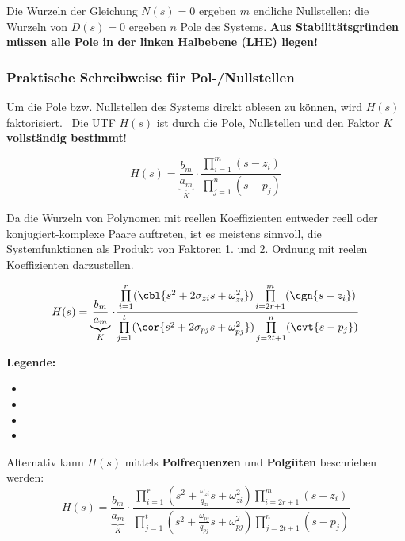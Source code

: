 Die Wurzeln der Gleichung $N(s) = 0$ ergeben $m$ endliche Nullstellen; die Wurzeln von $D(s) = 0$ ergeben $n$ Pole des Systems.
\textbf{Aus Stabilitätsgründen müssen alle Pole in der linken Halbebene (LHE) liegen!}


\subsubsection{Praktische Schreibweise für Pol-/Nullstellen}

Um die Pole bzw. Nullstellen des Systems direkt ablesen zu können, wird $H(s)$ faktorisiert. \textrightarrow\ Die UTF $H(s)$ ist durch
die Pole, Nullstellen und den Faktor $K$ \textbf{vollständig bestimmt}!

$$ H(s) = \underbrace{\frac{b_m}{a_m}}_{K} \cdot \frac{\prod\limits_{i=1}^m (s - z_i)}{\prod\limits_{j=1}^n (s - p_j)} $$


Da die Wurzeln von Polynomen mit reellen Koeffizienten entweder reell oder konjugiert-komplexe Paare auftreten, ist es meistens
sinnvoll, die Systemfunktionen als Produkt von Faktoren 1. und 2. Ordnung mit reelen Koeffizienten darzustellen.

$$ H(s) = \underbrace{\frac{b_m}{a_m}}_{K} \cdot 
    \frac{\prod\limits_{i=1}^r (\cbl{s^2 + 2 \sigma_{zi} s + \omega_{zi}^2}) \prod\limits_{i=2r+1}^m (\cgn{s - z_i})}
    {\prod\limits_{j=1}^t (\cor{s^2 + 2 \sigma_{pj} s + \omega_{pj}^2}) \prod\limits_{j=2t+1}^n (\cvt{s - p_j})} $$

\textbf{Legende:}
\begin{itemize}
    \item {} 
    \item {}
    \item {} 
    \item {} 
\end{itemize}

\vspace{0.2cm}

Alternativ kann $H(s)$ mittels \textbf{Polfrequenzen} und \textbf{Polgüten} beschrieben werden:
$$ H(s) = \underbrace{\frac{b_m}{a_m}}_{K} \cdot 
    \frac{\prod\limits_{i=1}^r (s^2 + \frac{\omega_{zi}}{q_{zi}} s + \omega_{zi}^2) \prod\limits_{i=2r+1}^m (s - z_i)}
    {\prod\limits_{j=1}^t (s^2 +\frac{\omega_{pj}}{q_{pj}} s + \omega_{pj}^2) \prod\limits_{j=2t+1}^n (s - p_j)} $$

